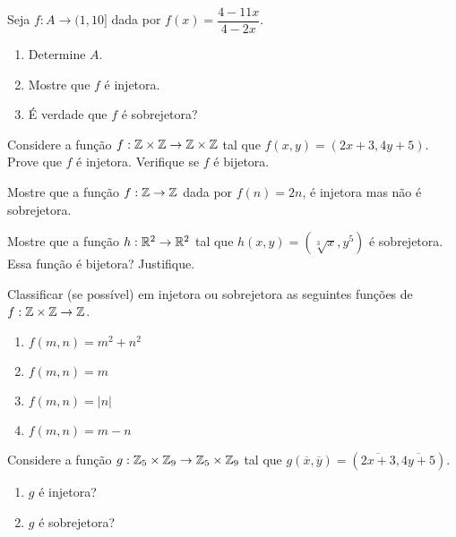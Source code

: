 \documentclass[12pt]{exam}
\begin{document}
\vspace{.3cm}

\questao{} Seja $f : A \to (1,10]$ dada por $f(x) = \dfrac{4 - 11x}{4 - 2x}$.
\begin{enumerate}[label={\alph*})]
    \item Determine $A$.

    \item Mostre que $f$ é injetora.

    \item É verdade que $f$ é sobrejetora?
\end{enumerate}

\vspace{.3cm}

\questao{} Considere a função $f : \mathbb{Z} \times \mathbb{Z} \to \mathbb{Z} \times \mathbb{Z}$ tal que $f(x,y) = (2x + 3, 4y + 5)$. Prove que $f$ é injetora. Verifique se $f$ é bijetora.

\vspace{.3cm}

\questao{} Mostre que a função $f : \mathbb{Z} \to \mathbb{Z}$ dada por $f(n) = 2n$, é injetora mas não é sobrejetora.

\vspace{.3cm}

\questao{} Mostre que a função $h : \mathbb{R}^2 \to \mathbb{R}^2$ tal que $h(x, y) = (\sqrt[3]{x}, y^5)$ é sobrejetora. Essa função é bijetora? Justifique.

\vspace{.3cm}

\questao{} Classificar (se possível) em injetora ou sobrejetora as seguintes funç{õ}es de $f : \mathbb{Z} \times \mathbb{Z} \to \mathbb{Z}$.

\begin{multicols}{2}
    \begin{enumerate}[label={\alph*})]
        \item $f(m, n) = m^2 + n^2$

        \item $f(m, n) = m$

        \item $f(m, n) = |n|$

        \item $f(m, n) = m - n$
    \end{enumerate}
\end{multicols}

\vspace{.3cm}

\questao{} Considere a função $g : \mathbb{Z}_5 \times \mathbb{Z}_9 \to \mathbb{Z}_5 \times \mathbb{Z}_9$ tal que $g(\overline{x},\overline{y}) = (\overline{2x + 3}, \overline{4y + 5})$.
\begin{enumerate}[label={\alph*})]
    \item $g$ é injetora?

    \item $g$ é sobrejetora?
\end{enumerate}
\end{document}
